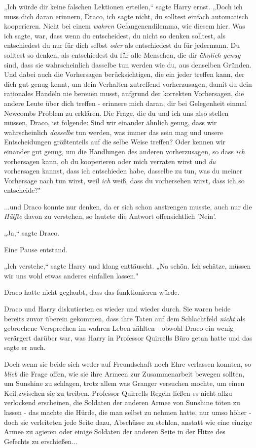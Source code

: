 {„Ich würde dir keine falschen Lektionen erteilen,“ sagte Harry ernst. „Doch ich muss dich daran erinnern, Draco, ich sagte nicht, du solltest einfach automatisch kooperieren. Nicht bei einem \emph{wahren} Gefangenendilemma, wie diesem hier. Was ich sagte, war, dass wenn du entscheidest, du nicht so denken solltest, als entschiedest du nur für dich selbst \emph{oder} als entschiedest du für jedermann. Du solltest so denken, als entschiedest du für alle Menschen, die dir \emph{ähnlich genug} sind, dass sie wahrscheinlich dasselbe tun werden wie du, aus denselben Gründen. Und dabei auch die Vorhersagen berücksichtigen, die ein jeder treffen kann, der dich gut genug kennt, um dein Verhalten zutreffend vorherzusagen, damit du dein rationales Handeln nie bereuen musst, aufgrund der korrekten Vorhersagen, die andere Leute über dich treffen - erinnere mich daran, dir bei Gelegenheit einmal Newcombs Problem zu erklären. Die Frage, die du und ich uns also stellen müssen, Draco, ist folgende: Sind wir einander ähnlich genug, dass wir wahrscheinlich \emph{dasselbe} tun werden, was immer das sein mag und unsere Entscheidungen größtenteils auf die selbe Weise treffen? Oder kennen wir einander gut genug, um die Handlungen des anderen vorherzusagen, so dass \emph{ich} vorhersagen kann, ob du kooperieren oder mich verraten wirst und \emph{du} vorhersagen kannst, dass ich entschieden habe, dasselbe zu tun, was du meiner Vorhersage nach tun wirst, weil \emph{ich} weiß, dass du vorhersehen wirst, dass ich so entscheide?"

...und Draco konnte nur denken, da er sich schon anstrengen musste, auch nur die \emph{Hälfte} davon zu verstehen, so lautete die Antwort offensichtlich 'Nein'.

„Ja,“ sagte Draco.

Eine Pause entstand.

„Ich verstehe,“ sagte Harry und klang enttäuscht. „Na schön. Ich schätze, müssen wir uns wohl etwas anderes einfallen lassen."

Draco hatte nicht geglaubt, dass das funktionieren würde.

Draco und Harry diskutierten es wieder und wieder durch. Sie waren beide bereits zuvor überein gekommen, dass ihre Taten auf dem Schlachtfeld \emph{nicht} als gebrochene Versprechen im wahren Leben zählten - obwohl Draco ein wenig verärgert darüber war, was Harry in Professor Quirrells Büro getan hatte und das sagte er auch.

Doch wenn sie beide sich weder auf Freundschaft noch Ehre verlassen konnten, so \emph{blieb} die Frage offen, wie sie ihre Armeen zur Zusammenarbeit bewegen sollten, um Sunshine zu schlagen, trotz allem was Granger versuchen mochte, um einen Keil zwischen sie zu treiben. Professor Quirrells Regeln ließen es nicht allzu verlockend erscheinen, die Soldaten der anderen Armee von Sunshine töten zu lassen - das machte die Hürde, die man selbst zu nehmen hatte, nur umso höher - doch sie verleiteten jede Seite dazu, Abschüsse zu stehlen, anstatt wie eine einzige Armee zu agieren oder einige Soldaten der anderen Seite in der Hitze des Gefechts zu erschießen...

}
